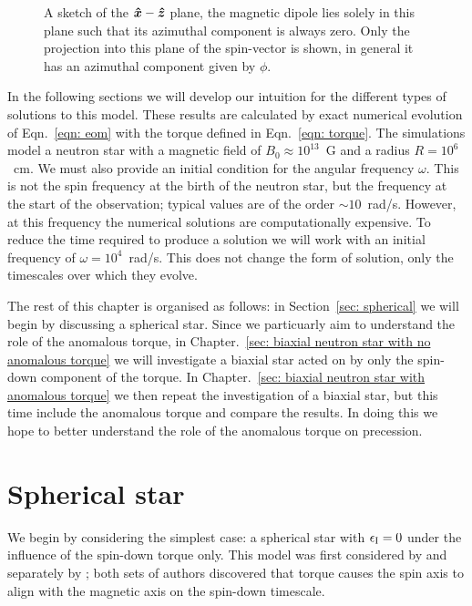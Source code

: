 \documentclass[../full_thesis/full_thesis.tex]{subfiles}
\newcommand{\thisdir}{../rotating_frame}
\begin{document}
\begin{figure}[ht]
\centering

\caption{A sketch of the  $\boldsymbol{\hat{x}}-\boldsymbol{\hat{z}}$ plane,  the magnetic dipole lies solely in
this plane such that its azimuthal component is always zero.  Only the
projection into this plane of the spin-vector is shown, in general it has an
azimuthal component given by $\phi$.}
	\label{fig: sketch01}
\end{figure}

In the following sections we will develop our intuition for the different types
of solutions to this model. These results are calculated by exact numerical
evolution of Eqn.~\eqref{eqn: eom} with the torque defined in Eqn.~\eqref{eqn:
torque}. The simulations model a neutron star with a magnetic field of
$B_{0}\approx10^{13}$~G and a radius $R=10^{6}$~cm. We must also provide an
initial condition for the angular frequency $\omega$. This is not the spin
frequency at the birth of the neutron star, but the frequency at the start of
the observation; typical values are of the order $\sim 10$~rad/s. However, at
this frequency the numerical solutions are computationally expensive. To reduce
the time required to produce a solution we will work with an initial frequency
of $\omega = 10^{4}$~rad/s. This does not change the form of solution, only the
timescales over which they evolve.

The rest of this chapter is organised as follows: in Section~\ref{sec:
spherical} we will begin by discussing a spherical star. Since we particuarly
aim to understand the role of the anomalous torque, in Chapter.~\ref{sec:
biaxial neutron star with no anomalous torque} we will investigate a biaxial
star acted on by only the spin-down component of the torque. In
Chapter.~\ref{sec: biaxial neutron star with anomalous torque} we then repeat
the investigation of a biaxial star, but this time include the anomalous torque
and compare the results. In doing this we hope to better understand the role of
the anomalous torque on precession.

\section{Spherical star}
\label{sec: spherical}

We begin by considering the simplest case: a spherical star with $\epsilon_{\mathrm{I}}=0$
under the influence of the spin-down torque only. This model was first considered
by \citet{Davis1970} and separately by \citet{Michel1970}; both sets of authors
discovered that torque causes the spin axis to align with the magnetic axis on
the spin-down timescale.
\end{document}
